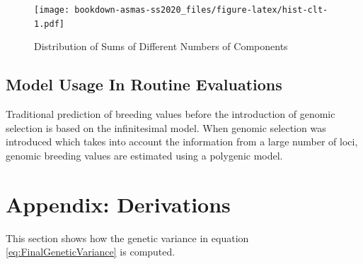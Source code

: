 \documentclass[]{book}
\theoremstyle{definition}
\theoremstyle{definition}
\theoremstyle{definition}
\theoremstyle{remark}
\begin{document}
\begin{figure}
\centering
\texttt{[image: bookdown-asmas-ss2020\_files/figure-latex/hist-clt-1.pdf]}
\caption{\label{fig:hist-clt}Distribution of Sums of Different Numbers of Components}
\end{figure}

\hypertarget{model-usage-in-routine-evaluations}{%
\subsection{Model Usage In Routine Evaluations}\label{model-usage-in-routine-evaluations}}

Traditional prediction of breeding values before the introduction of genomic selection is based on the infinitesimal model. When genomic selection was introduced which takes into account the information from a large number of loci, genomic breeding values are estimated using a polygenic model.

\hypertarget{appendix-derivations}{%
\section{Appendix: Derivations}\label{appendix-derivations}}

This section shows how the genetic variance in equation \eqref{eq:FinalGeneticVariance} is computed.
\end{document}
